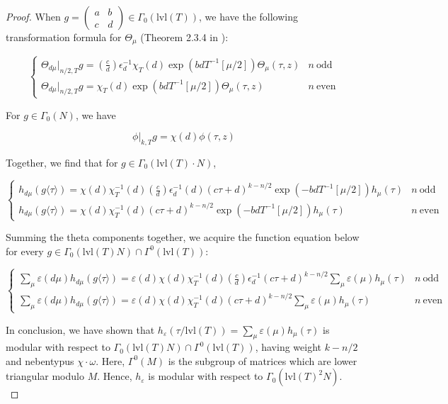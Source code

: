 \documentclass[11pt]{article}
\theoremstyle{definition}
\theoremstyle{remark}
\begin{document}
\begin{proof}
    When $g = \begin{pmatrix} a & b \\ c & d \end{pmatrix}\in \Gamma_0(\text{lvl}(T))$, we have the following transformation formula for $\Theta_\mu$ (Theorem 2.3.4 in \cite{Ajouz}):

\[
\begin{cases}
    \Theta_{d\mu}\vert_{n/2, T}g = \left(\frac{c}{d}\right) \epsilon_d^{-1} \chi_T(d)\exp(bdT^{-1}[\mu/2]) \Theta_\mu(\tau,z) & n \ \text{odd} \\ 
    \Theta_{d\mu}\vert_{n/2, T}g = \chi_T(d)\exp(bdT^{-1}[\mu/2]) \Theta_\mu(\tau,z) & n \ \text{even}
\end{cases}
\]

For $g \in \Gamma_0(N)$, we have 

\[
\phi \vert_{k,T} g = \chi(d) \phi(\tau,z)
\]

Together, we find that for $g \in \Gamma_0(\text{lvl}(T) \cdot N)$, 

\begin{equation}
\begin{cases} \label{theta component law}
    h_{d\mu}(g \langle \tau \rangle) = \chi(d)\chi_T^{-1}(d) \left(\frac{c}{d}\right) \epsilon_d^{-1}(d) (c \tau + d)^{k-n/2} \exp(-bdT^{-1}[\mu/2]) h_\mu(\tau) & n \ \text{odd} \\ 
    h_{d\mu}(g \langle \tau \rangle) = \chi(d)\chi_T^{-1}(d) (c \tau + d)^{k-n/2} \exp(-bdT^{-1}[\mu/2]) h_\mu(\tau) & n \ \text{even}
\end{cases}
\end{equation}

Summing the theta components together, we acquire the function equation below for every $g \in \Gamma_0(\text{lvl}(T)N) \cap \Gamma^0(\text{lvl}(T))$:

\[
\begin{cases}
    \sum_\mu \varepsilon(d\mu)h_{d\mu}(g \langle \tau \rangle) = \varepsilon(d)\chi(d) \chi_T^{-1}(d) \left(\frac{c}{d}\right) \epsilon_d^{-1} (c\tau+d)^{k-n/2} \sum_\mu \varepsilon(\mu)h_\mu(\tau) & n \ \text{odd} \\ 
    \sum_\mu \varepsilon(d\mu)h_{d\mu}(g \langle \tau \rangle) = \varepsilon(d)\chi(d) \chi_T^{-1}(d) (c\tau+d)^{k-n/2} \sum_\mu \varepsilon(\mu)h_\mu(\tau) & n \ \text{even}
\end{cases}
\]

In conclusion, we have shown that $h_\varepsilon(\tau/\text{lvl}(T)) = \sum_\mu \varepsilon(\mu)h_\mu(\tau)$ is modular with respect to $\Gamma_0(\text{lvl}(T)N) \cap \Gamma^0(\text{lvl}(T))$, having weight $k-n/2$ and nebentypus $\chi \cdot \omega$. Here, $\Gamma^0(M)$ is the subgroup of matrices which are lower triangular modulo $M$. Hence, $h_\varepsilon$ is modular with respect to $\Gamma_0(\text{lvl}(T)^2N)$. \\


\end{proof}
\end{document}
